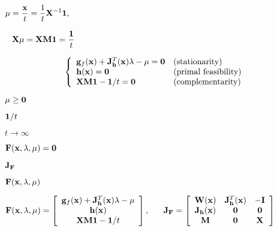 \documentclass{article}
\def\lthtmlcheckvsize{\ifdim\ht\sizebox<\vsize 
  \ifdim\wd\sizebox<\hsize\expandafter\hfill\fi \expandafter\vfill
  \else\expandafter\vss\fi}%
\begin{document}
{\newpage\clearpage
{}%
$\displaystyle {\bf\mu}=\frac{\bf x}{t}=\frac{1}{t}{\bf X}^{-1}{\bf 1},
\;\;\;\;$%
\lthtmlindisplaymathZ
\lthtmlcheckvsize\clearpage}

{\newpage\clearpage
{}%
$\displaystyle \;\;\;
{\bf X\mu}={\bf XM 1}=\frac{\bf 1}{t}$%
\lthtmlindisplaymathZ
\lthtmlcheckvsize\clearpage}

{\newpage\clearpage
{}%
\begin{displaymath}\left\{
\begin{array}{ll}
{\bf g}_f({\bf x})+{\bf J}_{\bf h}^T({\bf x}){\bf\lambda}-\mu={\bf0} &
\mbox{(stationarity)}\\
{\bf h}({\bf x})={\bf0} & \mbox{(primal feasibility)}\\
{\bf XM1}-{\bf 1}/t={\bf0} & \mbox{(complementarity)}
\end{array}\right.\end{displaymath}%
\lthtmldisplayZ
\lthtmlcheckvsize\clearpage}

{\newpage\clearpage
{}%
$ {\bf\mu}\ge{\bf0}$%
\lthtmlindisplaymathZ
\lthtmlcheckvsize\clearpage}

{\newpage\clearpage
{}%
$ {\bf 1}/t$%
\lthtmlindisplaymathZ
\lthtmlcheckvsize\clearpage}

{\newpage\clearpage
{}%
$ t\rightarrow\infty$%
\lthtmlindisplaymathZ
\lthtmlcheckvsize\clearpage}

{\newpage\clearpage
{}%
$ {\bf F}({\bf x},{\bf\lambda},{\bf\mu})={\bf0}$%
\lthtmlindisplaymathZ
\lthtmlcheckvsize\clearpage}

{\newpage\clearpage
{}%
$ {\bf J}_{\bf F}$%
\lthtmlindisplaymathZ
\lthtmlcheckvsize\clearpage}

{\newpage\clearpage
{}%
$ {\bf F}({\bf x},{\bf\lambda},{\bf\mu})$%
\lthtmlindisplaymathZ
\lthtmlcheckvsize\clearpage}

{\newpage\clearpage
{}%
$\displaystyle {\bf F}({\bf x},{\bf\lambda},{\bf\mu})=\left[ \begin{array}{c}
{\bf g}_f({\bf x})+{\bf J}_{\bf h}^T({\bf x}){\bf\lambda}-\mu\\
{\bf h}({\bf x})\\{\bf XM1}-{\bf 1}/t \end{array}\right],
\;\;\;\;\;\;
{\bf J}_{\bf F}=\left[\begin{array}{ccc}
{\bf W}({\bf x}) & {\bf J}^T_{\bf h}({\bf x}) & -{\bf I}\\
{\bf J}_{\bf h}({\bf x}) & {\bf0} & {\bf0} \\
{\bf M} & {\bf0} & {\bf X}\end{array}\right]$%
\lthtmlindisplaymathZ
\lthtmlcheckvsize\clearpage}
\end{document}
